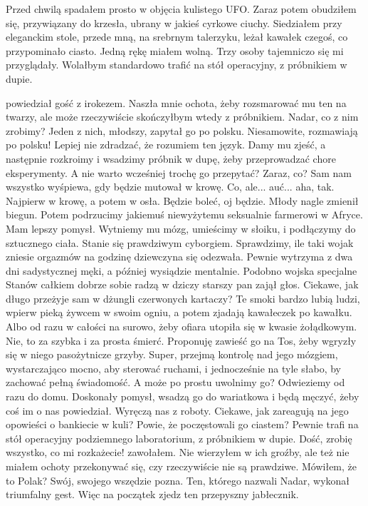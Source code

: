 Przed chwilą spadałem prosto w objęcia kulistego UFO. Zaraz potem obudziłem się, przywiązany do krzesła, ubrany w jakieś cyrkowe ciuchy.
Siedziałem przy eleganckim stole, przede mną, na srebrnym talerzyku, leżał kawałek czegoś, co przypominało ciasto. Jedną rękę miałem wolną.
Trzy osoby tajemniczo się mi przyglądały. Wolałbym standardowo trafić na stół operacyjny, z próbnikiem w dupie.
\begin{dialogue}
\ds{}  \dm{} powiedział gość z irokezem. 
Naszła mnie ochota, żeby rozsmarować mu ten  na twarzy, ale może rzeczywiście skończyłbym wtedy z próbnikiem.
\ds{} Nadar, co z nim zrobimy? \dm{} Jeden z nich, młodszy, zapytał go po polsku. Niesamowite, rozmawiają po polsku! Lepiej nie zdradzać, że rozumiem ten język.
\ds{} Damy mu zjeść, a następnie rozkroimy i wsadzimy próbnik w dupę, żeby przeprowadzać chore eksperymenty.
\ds{} A nie warto wcześniej trochę go przepytać? Zaraz, co?
\ds{} Sam nam wszystko wyśpiewa, gdy będzie mutował w krowę.
\ds{} Co, ale... auć... aha, tak. Najpierw w krowę, a potem w osła. Będzie boleć, oj będzie. \dm{} Młody nagle zmienił biegun.
\ds{} Potem podrzucimy jakiemuś niewyżytemu seksualnie farmerowi w Afryce.
\ds{} Mam lepszy pomysł. Wytniemy mu mózg, umieścimy w słoiku, i podłączymy do sztucznego ciała. Stanie się prawdziwym cyborgiem.
\ds{} Sprawdzimy, ile taki wojak zniesie orgazmów na godzinę \dm{} dziewczyna się odezwała. \dm{} Pewnie wytrzyma z dwa dni sadystycznej męki, a później wysiądzie mentalnie.
\ds{} Podobno wojska specjalne Stanów całkiem dobrze sobie radzą w dziczy \dm{} starszy pan zajął głos. \dm{} Ciekawe, jak długo przeżyje sam w dżungli czerwonych kartaczy?
Te smoki bardzo lubią ludzi, wpierw pieką żywcem w swoim ogniu, a potem zjadają kawałeczek po kawałku.
\ds{} Albo od razu w całości na surowo, żeby ofiara utopiła się w kwasie żołądkowym.
\ds{} Nie, to za szybka i za prosta śmierć. Proponuję zawieść go na Tos, żeby wgryzły się w niego pasożytnicze grzyby.
\ds{} Super, przejmą kontrolę nad jego mózgiem, wystarczająco mocno, aby sterować ruchami, i jednocześnie na tyle słabo, by zachować pełną świadomość.
\ds{} A może po prostu uwolnimy go? Odwieziemy od razu do domu.
\ds{} Doskonały pomysł, wsadzą go do wariatkowa i będą męczyć, żeby coś im o nas powiedział. Wyręczą nas z roboty. 
Ciekawe, jak zareagują na jego opowieści o bankiecie w kuli? Powie, że poczęstowali go ciastem?
\ds{} Pewnie trafi na stół operacyjny podziemnego laboratorium, z próbnikiem w dupie.
\ds{} Dość, zrobię wszystko, co mi rozkażecie! \dm{} zawołałem. Nie wierzyłem w ich groźby, ale też nie miałem ochoty przekonywać się, czy rzeczywiście nie są prawdziwe.
\ds{} Mówiłem, że to Polak? Swój, swojego wszędzie pozna. \dm{} Ten, którego nazwali Nadar, wykonał triumfalny gest. \dm{} Więc na początek zjedz ten przepyszny jabłecznik.
\end{dialogue}

